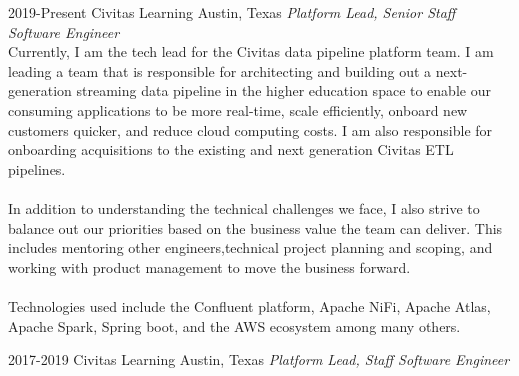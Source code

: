 \documentclass{friggeri-cv} %
\begin{document}
\begin{entrylist}
\entry
{2019-Present}
{Civitas Learning}
{Austin, Texas}
{\emph{Platform Lead, Senior Staff Software Engineer} \\
Currently, I am the tech lead for the Civitas data pipeline platform team. I am leading a team that is responsible for architecting and building out a next-generation streaming data pipeline in the higher education space to enable our consuming applications to be more real-time, scale efficiently, onboard new customers quicker, and reduce cloud computing costs. I am also responsible for onboarding acquisitions to the existing and next generation Civitas ETL pipelines. \\ \\
In addition to understanding the technical challenges we face, I also strive to balance out our priorities based on the business value the team can deliver. This includes mentoring other engineers,technical project planning and scoping, and working with product management to move the business forward. \\ \\
Technologies used include the Confluent platform, Apache NiFi, Apache Atlas, Apache Spark, Spring boot, and the AWS ecosystem among many others.}
\end{entrylist}
\begin{entrylist}
\entry
{2017-2019}
{Civitas Learning}
{Austin, Texas}
{\emph{Platform Lead, Staff Software Engineer}}
\end{entrylist}
\end{document}
